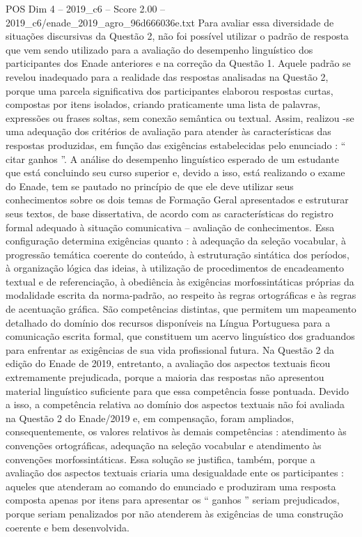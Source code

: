 \begin{textsample}{POS Dim 4 – 2019\_c6 – Score 2.00 – 2019\_c6/enade\_2019\_agro\_96d666036e.txt}
Para avaliar essa diversidade de situações discursivas da Questão 2, não foi possível utilizar o padrão de resposta que vem sendo utilizado para a avaliação do desempenho linguístico dos participantes dos Enade anteriores e na correção da Questão 1.
Aquele padrão se revelou inadequado para a realidade das respostas analisadas na Questão 2, porque uma parcela significativa dos participantes elaborou respostas curtas, compostas por itens isolados, criando praticamente uma lista de palavras, expressões ou frases soltas, sem conexão semântica ou textual.
Assim, realizou -se uma adequação dos critérios de avaliação para atender às características das respostas produzidas, em função das exigências estabelecidas pelo enunciado : “ citar ganhos ”.
A análise do desempenho linguístico esperado de um estudante que está concluindo seu curso superior e, devido a isso, está realizando o exame do Enade, tem se pautado no princípio de que ele deve utilizar seus conhecimentos sobre os dois temas de Formação Geral apresentados e estruturar seus textos, de base dissertativa, de acordo com as características do registro formal adequado à situação comunicativa – avaliação de conhecimentos.
Essa configuração determina exigências quanto : à adequação da seleção vocabular, à progressão temática coerente do conteúdo, à estruturação sintática dos períodos, à organização lógica das ideias, à utilização de procedimentos de encadeamento textual e de referenciação, à obediência às exigências morfossintáticas próprias da modalidade escrita da norma-padrão, ao respeito às regras ortográficas e às regras de acentuação gráfica.
São competências distintas, que permitem um mapeamento detalhado do domínio dos recursos disponíveis na Língua Portuguesa para a comunicação escrita formal, que constituem um acervo linguístico dos graduandos para enfrentar as exigências de sua vida profissional futura.
Na Questão 2 da edição do Enade de 2019, entretanto, a avaliação dos aspectos textuais ficou extremamente prejudicada, porque a maioria das respostas não apresentou material linguístico suficiente para que essa competência fosse pontuada.
Devido a isso, a competência relativa ao domínio dos aspectos textuais não foi avaliada na Questão 2 do Enade/2019 e, em compensação, foram ampliados, consequentemente, os valores relativos às demais competências : atendimento às convenções ortográficas, adequação na seleção vocabular e atendimento às convenções morfossintáticas.
Essa solução se justifica, também, porque a avaliação dos aspectos textuais criaria uma desigualdade ente os participantes : aqueles que atenderam ao comando do enunciado e produziram uma resposta composta apenas por itens para apresentar os “ ganhos ” seriam prejudicados, porque seriam penalizados por não atenderem às exigências de uma construção coerente e bem desenvolvida.

\end{textsample}
